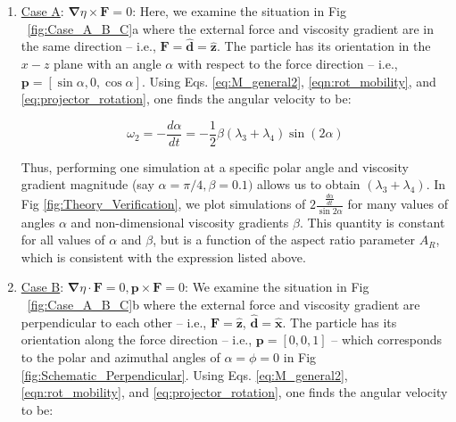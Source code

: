 \documentclass{jfm}
\begin{document}
\begin{enumerate}
    \item \underline{Case A}: $\boldsymbol{\nabla} \eta \times \boldsymbol{F} =0$: Here, we examine the situation in Fig ~\ref{fig:Case_A_B_C}a where the external force and viscosity gradient are in the same direction – i.e., $\boldsymbol{F} = \boldsymbol{\hat{d}} = \boldsymbol{\hat{z}}$.  The particle has its orientation in the $x-z$ plane with an angle $\alpha$ with respect to the force direction – i.e., $\boldsymbol{p} =[\sin \alpha,0,\cos \alpha]$. Using Eqs.  \eqref{eq:M_general2}, \eqref{eqn:rot_mobility}, and \eqref{eq:projector_rotation}, one finds the angular velocity to be:

    \begin{equation}
    \label{eq:evolution_caseA}
    \omega_2=-\frac{d \alpha}{d t} = -\frac{1}{2} \beta\left(\lambda_3+\lambda_4\right) \sin({2\alpha})
    \end{equation}

    Thus, performing one simulation at a specific polar angle and viscosity gradient magnitude (say $\alpha=\pi/4, \beta=0.1)$ allows us to obtain $(\lambda_3+\lambda_4)$.  In Fig \ref{fig:Theory_Verification}, we plot simulations of $2\frac{\frac{d \alpha}{d t}}{\sin{2\alpha}}$ for many values of angles $\alpha$ and non-dimensional viscosity gradients $\beta$.  This quantity is constant for all values of $\alpha$ and $\beta$, but is a function of the aspect ratio parameter $A_R$, which is consistent with the expression listed above.\\

    \item \underline{Case B}: $\boldsymbol{\nabla} \eta \cdot \boldsymbol{F} =0, \boldsymbol{p} \times \boldsymbol{F} = 0$:  We examine the situation in Fig ~\ref{fig:Case_A_B_C}b where the external force and viscosity gradient are perpendicular to each other – i.e., $\boldsymbol{F}=\boldsymbol{\hat{z}}$, $\boldsymbol{\hat{d}}= \boldsymbol{\hat{x}}$.  The particle has its orientation along the force direction -- i.e., $\boldsymbol{p}=[0,0,1]$ -- which corresponds to the polar and azimuthal angles of $\alpha = \phi = 0$ in Fig \ref{fig:Schematic_Perpendicular}.  Using Eqs.  \eqref{eq:M_general2}, \eqref{eqn:rot_mobility}, and \eqref{eq:projector_rotation}, one finds the angular velocity to be:



\end{enumerate}
\end{document}
